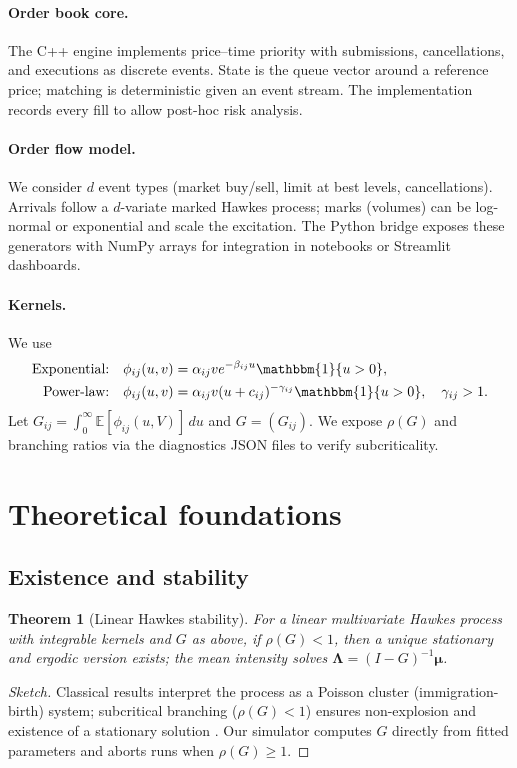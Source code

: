 \documentclass[11pt]{article}
\newtheorem{theorem}{Theorem}[section]
\newcommand{\E}{\mathbb{E}}
\newcommand{\1}{\mathbbm{1}}
\begin{document}
\paragraph{Order book core.} The C++ engine implements price--time priority with submissions, cancellations, and executions as discrete events. State is the queue vector around a reference price; matching is deterministic given an event stream. The implementation records every fill to allow post-hoc risk analysis.

\paragraph{Order flow model.} We consider $d$ event types (market buy/sell, limit at best levels, cancellations). Arrivals follow a $d$-variate marked Hawkes process; marks (volumes) can be log-normal or exponential and scale the excitation. The Python bridge exposes these generators with NumPy arrays for integration in notebooks or Streamlit dashboards.

\paragraph{Kernels.} We use
\begin{align}
\text{Exponential:}\quad & \phi_{ij}(u,v) = \alpha_{ij} v e^{-\beta_{ij} u} \1\{u>0\},\\
\text{Power-law:}\quad & \phi_{ij}(u,v) = \alpha_{ij} v (u+c_{ij})^{-\gamma_{ij}} \1\{u>0\},\quad \gamma_{ij}>1.
\end{align}
Let $G_{ij}=\int_0^\infty \E[\phi_{ij}(u,V)]\,du$ and $G=(G_{ij})$. We expose $\rho(G)$ and branching ratios via the diagnostics JSON files to verify subcriticality.

\section{Theoretical foundations}\label{sec:theory}
\subsection{Existence and stability}\label{sec:stability}
\begin{theorem}[Linear Hawkes stability]
For a linear multivariate Hawkes process with integrable kernels and $G$ as above, if $\rho(G)<1$, then a unique stationary and ergodic version exists; the mean intensity solves $\bm{\Lambda}=(I-G)^{-1}\bm{\mu}$.
\end{theorem}
\begin{proof}[Sketch]
Classical results interpret the process as a Poisson cluster (immigration-birth) system; subcritical branching ($\rho(G)<1$) ensures non-explosion and existence of a stationary solution \cite{BremaudMassoulie1996,DaleyVereJones2003}. Our simulator computes $G$ directly from fitted parameters and aborts runs when $\rho(G)\ge 1$.
\end{proof}
\end{document}
